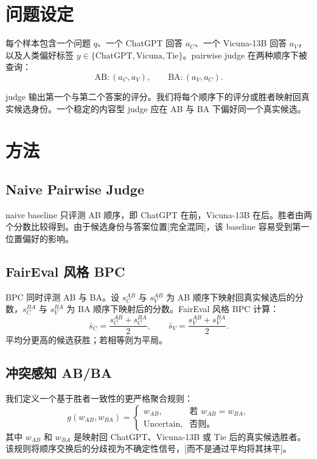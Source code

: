 \documentclass[11pt]{ctexart}
\begin{document}
\section{问题设定}

每个样本包含一个问题 $q$、一个 ChatGPT 回答 $a_C$、一个 Vicuna-13B 回答 $a_V$，以及人类偏好标签 $y \in \{\text{ChatGPT}, \text{Vicuna}, \text{Tie}\}$。pairwise judge 在两种顺序下被查询：
\[
\text{AB}: (a_C, a_V), \qquad
\text{BA}: (a_V, a_C).
\]

judge 输出第一个与第二个答案的评分。我们将每个顺序下的评分或胜者映射回真实候选身份。一个稳定的内容型 judge 应在 AB 与 BA 下偏好同一个真实候选。

\section{方法}

\subsection{Naive Pairwise Judge}

naive baseline 只评测 AB 顺序，即 ChatGPT 在前，Vicuna-13B 在后。胜者由两个分数比较得到。由于候选身份与答案位置[完全混同]，该 baseline 容易受到第一位置偏好的影响。

\subsection{FairEval 风格 BPC}

BPC 同时评测 AB 与 BA。设 $s_C^{AB}$ 与 $s_V^{AB}$ 为 AB 顺序下映射回真实候选后的分数，$s_C^{BA}$ 与 $s_V^{BA}$ 为 BA 顺序下映射后的分数。FairEval 风格 BPC 计算：
\[
\bar{s}_C = \frac{s_C^{AB} + s_C^{BA}}{2}, \qquad
\bar{s}_V = \frac{s_V^{AB} + s_V^{BA}}{2}.
\]
平均分更高的候选获胜；若相等则为平局。

\subsection{冲突感知 AB/BA}

我们定义一个基于胜者一致性的更严格聚合规则：
\[
g(w_{AB}, w_{BA}) =
\begin{cases}
w_{AB}, & \text{若 } w_{AB}=w_{BA},\\
\text{Uncertain}, & \text{否则。}
\end{cases}
\]
其中 $w_{AB}$ 和 $w_{BA}$ 是映射回 ChatGPT、Vicuna-13B 或 Tie 后的真实候选胜者。该规则将顺序交换后的分歧视为不确定性信号，[而不是通过平均将其抹平]。
\end{document}
